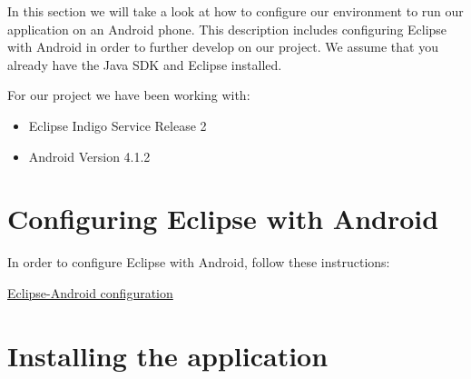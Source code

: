 
In this section we will take a look at how to configure
our environment to run our application on an Android phone. 
This description includes
configuring Eclipse with Android in order to further develop on our 
project. We assume that you already have the Java SDK and Eclipse installed.

For our project we have been working with:
\begin{itemize}
\item Eclipse Indigo Service Release 2
\item Android Version 4.1.2
\end{itemize}

\section{Configuring Eclipse with Android}
In order to configure Eclipse with Android, follow these
instructions:

\href{http://developer.android.com/sdk/installing/installing-adt.html}{Eclipse-Android configuration}
\section{Installing the application}
